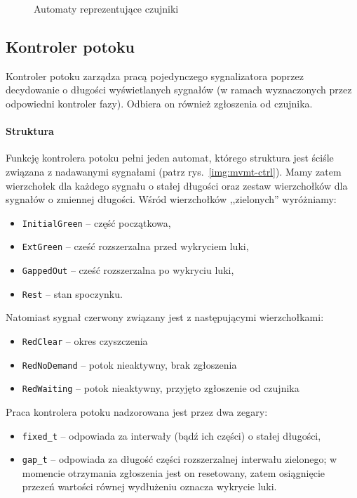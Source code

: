 \documentclass{pracamgr}
\newcommand{\imgr}[1]{rys.~\ref{#1}}
\theoremstyle{plain}
\begin{document}
\begin{figure}
  \centering
  \hspace{1cm}
  \caption{Automaty reprezentujące czujniki}
  \label{img:detectors}
\end{figure}

\subsection{Kontroler potoku}
Kontroler potoku zarządza pracą pojedynczego sygnalizatora poprzez
decydowanie o długości wyświetlanych sygnałów (w ramach wyznaczonych
przez odpowiedni kontroler fazy). Odbiera on również zgłoszenia od
czujnika.

\paragraph{Struktura} Funkcję kontrolera potoku pełni jeden automat,
którego struktura jest ściśle związana z nadawanymi sygnałami (patrz
\imgr{img:mvmt-ctrl}). Mamy zatem wierzchołek dla każdego sygnału o
stałej długości oraz zestaw wierzchołków dla sygnałów o zmiennej
długości. Wśród wierzchołków ,,zielonych'' wyróżniamy:
\begin{itemize}
  \item \texttt{InitialGreen} -- część początkowa,
  \item \texttt{ExtGreen} -- cześć rozszerzalna przed wykryciem luki,
  \item \texttt{GappedOut} -- cześć rozszerzalna po wykryciu luki,
  \item \texttt{Rest} -- stan spoczynku.
\end{itemize}
Natomiast sygnał czerwony związany jest z następującymi wierzchołkami:
\begin{itemize}
  \item \texttt{RedClear} -- okres czyszczenia
  \item \texttt{RedNoDemand} -- potok nieaktywny, brak zgłoszenia
  \item \texttt{RedWaiting} -- potok nieaktywny, przyjęto zgłoszenie
  od czujnika
\end{itemize}
Praca kontrolera potoku nadzorowana jest przez dwa zegary:
\begin{itemize}
  \item \texttt{fixed\_t} -- odpowiada za interwały (bądź ich części) o
  stałej długości,
  \item \texttt{gap\_t} -- odpowiada za długość części rozszerzalnej
  interwału zielonego; w momencie otrzymania zgłoszenia jest on
  resetowany, zatem osiągnięcie przezeń wartości równej wydłużeniu
  oznacza wykrycie luki.
\end{itemize}
\end{document}

